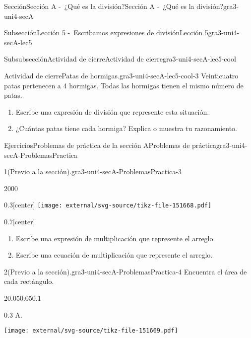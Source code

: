 \documentclass[twoside,14pt,]{extarticle}
\begin{document}
\begin{sectionptx}{Sección}{Sección A -~¿Qué es la división?}{}{Sección A -~¿Qué es la división?}{}{}{gra3-uni4-secA}
\begin{subsectionptx}{Subsección}{Lección 5 -~Escribamos expresiones de división}{}{Lección 5}{}{}{gra3-uni4-secA-lec5}
\begin{subsubsectionptx}{Subsubsección}{Actividad de cierre}{}{Actividad de cierre}{}{}{gra3-uni4-secA-lec5-cool}
\begin{project}{Actividad de cierre}{Patas de hormigas.}{gra3-uni4-secA-lec5-cool-3}%
Veinticuatro patas pertenecen a 4 hormigas. Todas las hormigas tienen el mismo número de patas.%
\par
%
\begin{enumerate}
\item{}Escribe una expresión de división que represente esta situación.%
\item{}¿Cuántas patas tiene cada hormiga? Explica o muestra tu razonamiento.%
\end{enumerate}
%
\end{project}%
\end{subsubsectionptx}
\end{subsectionptx}
%
%
\typeout{************************************************}
\typeout{************************************************}
%
\begin{exercises-subsection}{Ejercicios}{Problemas de práctica de la sección A}{}{Problemas de práctica}{}{}{gra3-uni4-secA-ProblemasPractica}
\begin{divisionexercise}{1}{(Previo a la sección).}{}{gra3-uni4-secA-ProblemasPractica-3}%
\begin{sidebyside}{2}{0}{0}{0}%
\begin{sbspanel}{0.3}[center]%
\texttt{[image: external/svg-source/tikz-file-151668.pdf]}
\end{sbspanel}%
\begin{sbspanel}{0.7}[center]%
%
\begin{enumerate}[label=(\alph*)]
\item{}Escribe una expresión de multiplicación que represente el arreglo.%
\item{}Escribe una ecuación de multiplicación que represente el arreglo.%
\end{enumerate}
%
\end{sbspanel}%
\end{sidebyside}%
\end{divisionexercise}%
\begin{divisionexercise}{2}{(Previo a la sección).}{}{gra3-uni4-secA-ProblemasPractica-4}%
Encuentra el área de cada rectángulo.%
\begin{sidebyside}{2}{0.05}{0.05}{0.1}%
\begin{sbspanel}{0.3}%
A.%
\par
\texttt{[image: external/svg-source/tikz-file-151669.pdf]}

\end{sbspanel}
\end{sidebyside}
\end{divisionexercise}
\end{exercises-subsection}
\end{sectionptx}
\end{document}
